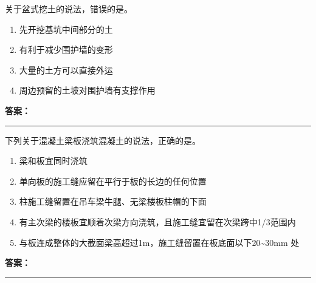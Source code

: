 \documentclass[UTF8,fontset=fandol,11pt]{ctexart}
\newcommand{\answerline}{\textcolor{answerred}{\rule{2.4cm}{0.7pt}}}
\begin{document}
\begin{quizbox}[title={乱序第 191 题｜第一章土方工程}]

关于盆式挖土的说法，错误的是。\\

\begin{enumerate}[label=\Alph*.]

\item 先开挖基坑中间部分的土

\item 有利于减少围护墙的变形

\item 大量的土方可以直接外运

\item 周边预留的土坡对围护墙有支撑作用

\end{enumerate}

\textbf{\textcolor{answerred}{答案：}} \answerline

\end{quizbox}

\vspace{0.2em}

\begin{quizbox}[title={乱序第 192 题｜第四章混凝土结构工程}]

下列关于混凝土梁板浇筑混凝土的说法，正确的是。\\

\begin{enumerate}[label=\Alph*.]

\item 梁和板宜同时浇筑

\item 单向板的施工缝应留在平行于板的长边的任何位置

\item 柱施工缝留置在吊车梁牛腿、无梁楼板柱帽的下面

\item 有主次梁的楼板宜顺着次梁方向浇筑，且施工缝宜留在次梁跨中1/3范围内

\item 与板连成整体的大截面梁高超过1m，施工缝留置在板底面以下20\textasciitilde{}30mm 处

\end{enumerate}

\textbf{\textcolor{answerred}{答案：}} \answerline

\end{quizbox}

\vspace{0.2em}
\end{document}
